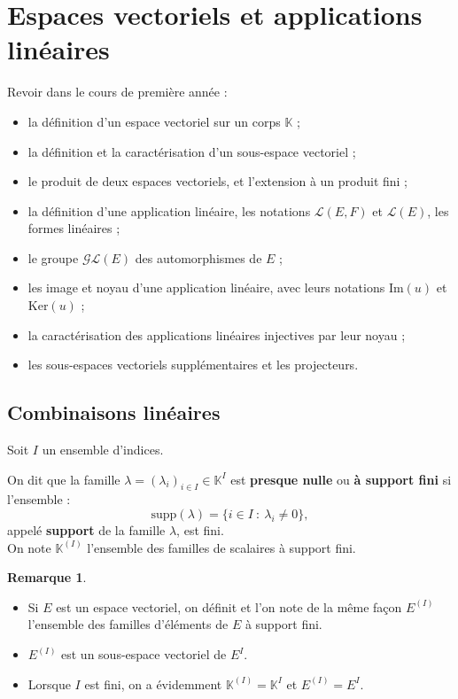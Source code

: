 \documentclass[french]{article}
\newcommand{\K}{\mathbb{K}}
\renewcommand{\ker}{\text{Ker}}
\theoremstyle{plain}
\theoremstyle{definition}
\newtheorem*{rmq}{Remarque}
\theoremstyle{remark}
\begin{document}
\section{Espaces vectoriels et applications linéaires}

Revoir dans le cours de première année :
\begin{itemize}
	\item la définition d'un espace vectoriel sur un corps $\K$ ;
	\item la définition et la caractérisation d'un sous-espace vectoriel ;
	\item le produit de deux espaces vectoriels, et l'extension à un produit fini ;
	\item la définition d'une application linéaire, les notations $\mathcal{L}(E,F)$ et $\mathcal{L}(E)$, les formes linéaires ;
	\item le groupe $\mathcal{GL}(E)$ des automorphismes de $E$ ;
	\item les image et noyau d'une application linéaire, avec leurs notations $\text{Im}(u)$ et $\ker(u)$ ;
	\item la caractérisation des applications linéaires injectives par leur noyau ;
	\item les sous-espaces vectoriels supplémentaires et les projecteurs.
\end{itemize}

\subsection{Combinaisons linéaires}

Soit $I$ un ensemble d'indices.

\begin{dfn}{}
	On dit que la famille $\lambda=(\lambda_i)_{i\in I}\in\K^I$ est \textbf{presque nulle} ou \textbf{à support fini} si l'ensemble : $$\text{supp}(\lambda)=\{i\in I\ : \ \lambda_i\ne 0\},$$ appelé \textbf{support} de la famille $\lambda$, est fini. \\
	On note $\K^{(I)}$ l'ensemble des familles de scalaires à support fini.
\end{dfn}

\begin{rmq}
	\begin{itemize}
		\item Si $E$ est un espace vectoriel, on définit et l'on note de la même façon $E^{(I)}$ l'ensemble des familles d'éléments de $E$ à support fini.
		\item $E^{(I)}$ est un sous-espace vectoriel de $E^I$.
		\item Lorsque $I$ est fini, on a évidemment $\K^{(I)}=\K^I$ et $E^{(I)}=E^I$.
	\end{itemize}
\end{rmq}
\end{document}
